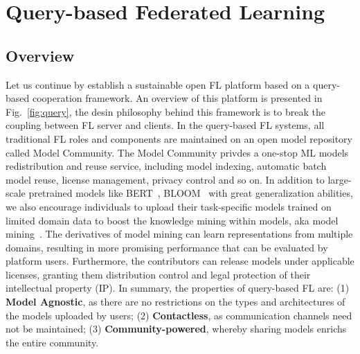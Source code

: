 \section{Query-based Federated Learning}
\label{sec:query}
\subsection{Overview}
\label{sec:query_overview}
Let us continue by establish a sustainable open FL platform based on a query-based cooperation framework.
An overview of this platform is presented in Fig.~\ref{fig:query}, the desin philosophy behind this framework is to break the coupling between FL server and clients.
In the query-based FL systems, all traditional FL roles and components are maintained on an open model repository called Model Community. The Model Community privdes a one-stop ML models redistribution and reuse service, including model indexing, automatic batch model reuse, license management, privacy control and so on.
In addition to large-scale pretrained models like BERT~\cite{devlin2018bert}, BLOOM~\cite{scao2022bloom} with great generalization abilities, we also encourage individuals to upload their task-specific models trained on limited domain data to boost the knowledge mining within models, aka model mining~\cite{you2021workshop}.
The derivatives of model mining can learn representations from multiple domains, resulting in more promising performance that can be evaluated by platform users.
Furthermore, the contributors can release models under applicable licenses, granting them distribution control and legal protection of their intellectual property (IP).
In summary, the properties of query-based FL are:
(1) \textbf{Model Agnostic}, as there are no restrictions on the types and architectures of the models uploaded by users;
(2) \textbf{Contactless}, as communication channels need not be maintained; 
(3) \textbf{Community-powered}, whereby sharing models enrichs the entire community.

